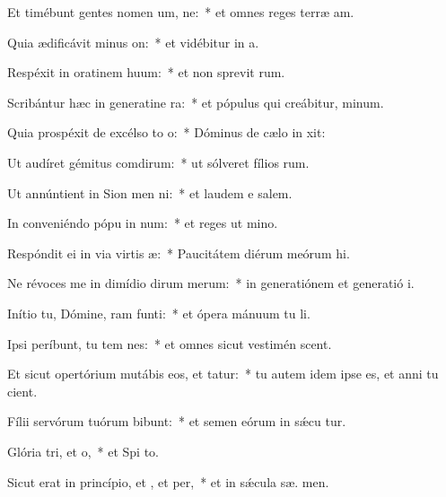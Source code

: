 \item Et timébunt gentes nomen um, ne:~* et omnes reges terræ  am.
\item Quia ædificávit minus on:~* et vidébitur in  a.
\item Respéxit in oratinem huum:~* et non sprevit  rum.
\item Scribántur hæc in generatine ra:~* et pópulus qui creábitur,  minum.
\item Quia prospéxit de excélso to o:~* Dóminus de cælo in  xit:
\item Ut audíret gémitus comdirum:~* ut sólveret fílios rum.
\item Ut annúntient in Sion men ni:~* et laudem e  salem.
\item In conveniéndo pópu in num:~* et reges ut  mino.
\item Respóndit ei in via virtis æ:~* Paucitátem diérum meórum  hi.
\item Ne révoces me in dimídio dirum merum:~* in generatiónem et generatió  i.
\item Inítio tu, Dómine, ram funti:~* et ópera mánuum tu  li.
\item Ipsi períbunt, tu tem nes:~* et omnes sicut vestimén scent.
\item Et sicut opertórium mutábis eos, et tatur:~* tu autem idem ipse es, et anni tu  cient.
\item Fílii servórum tuórum bibunt:~* et semen eórum in sǽcu tur.
\item Glória tri, et o,~* et Spi to.
\item Sicut erat in princípio, et , et per,~* et in sǽcula sæ. men.

